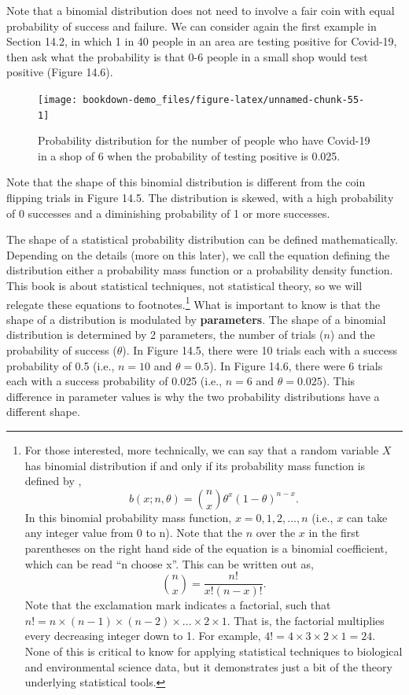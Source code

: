 \documentclass[
]{scrbook}
\begin{document}
Note that a binomial distribution does not need to involve a fair coin with equal probability of success and failure.
We can consider again the first example in Section 14.2, in which 1 in 40 people in an area are testing positive for Covid-19, then ask what the probability is that 0-6 people in a small shop would test positive (Figure 14.6).

\begin{figure}
\texttt{[image: bookdown-demo\_files/figure-latex/unnamed-chunk-55-1]} \caption{Probability distribution for the number of people who have Covid-19 in a shop of 6 when the probability of testing positive is 0.025.}\label{fig:unnamed-chunk-55}
\end{figure}

Note that the shape of this binomial distribution is different from the coin flipping trials in Figure 14.5.
The distribution is skewed, with a high probability of 0 successes and a diminishing probability of 1 or more successes.

The shape of a statistical probability distribution can be defined mathematically.
Depending on the details (more on this later), we call the equation defining the distribution either a probability mass function or a probability density function.
This book is about statistical techniques, not statistical theory, so we will relegate these equations to footnotes.\footnote{For those interested, more technically, we can say that a random variable \(X\) has binomial distribution if and only if its probability mass function is defined by \citep{Miller2004}, \[b \left(x; n, \theta \right) = {n \choose x} \theta^{x} \left(1 - \theta\right)^{n-x}.\] In this binomial probability mass function, \(x = 0, 1, 2, ..., n\) (i.e., \(x\) can take any integer value from 0 to n). Note that the \(n\) over the \(x\) in the first parentheses on the right hand side of the equation is a binomial coefficient, which can be read ``n choose x''. This can be written out as, \[{n \choose x} = \frac{n!}{x!(n - x)!}.\] Note that the exclamation mark indicates a factorial, such that \(n! = n \times (n-1) \times (n - 2) \times ... \times 2 \times 1\). That is, the factorial multiplies every decreasing integer down to 1. For example, \(4! = 4 \times 3 \times 2 \times 1 = 24\). None of this is critical to know for applying statistical techniques to biological and environmental science data, but it demonstrates just a bit of the theory underlying statistical tools.}
What is important to know is that the shape of a distribution is modulated by \textbf{parameters}.
The shape of a binomial distribution is determined by 2 parameters, the number of trials (\(n\)) and the probability of success (\(\theta\)).
In Figure 14.5, there were 10 trials each with a success probability of 0.5 (i.e., \(n = 10\) and \(\theta = 0.5\)).
In Figure 14.6, there were 6 trials each with a success probability of 0.025 (i.e., \(n = 6\) and \(\theta = 0.025\)).
This difference in parameter values is why the two probability distributions have a different shape.
\end{document}
